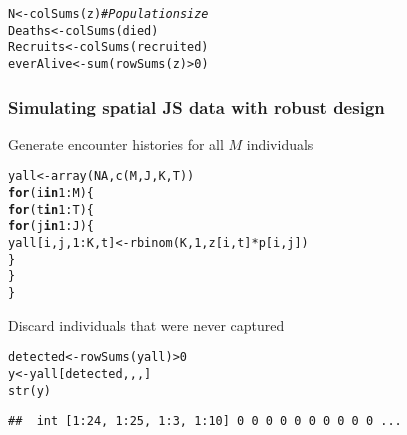 \documentclass[color=usenames,dvipsnames]{beamer}\usepackage[]{graphicx}\usepackage[]{color}
\makeatletter
\newcommand{\hlnum}[1]{\textcolor[rgb]{0.69,0.494,0}{#1}}%
\newcommand{\hlcom}[1]{\textcolor[rgb]{0.514,0.506,0.514}{\textit{#1}}}%
\newcommand{\hlopt}[1]{\textcolor[rgb]{0,0,0}{#1}}%
\newcommand{\hlstd}[1]{\textcolor[rgb]{0,0,0}{#1}}%
\newcommand{\hlkwa}[1]{\textcolor[rgb]{0,0,0}{\textbf{#1}}}%
\newcommand{\hlkwb}[1]{\textcolor[rgb]{0,0.341,0.682}{#1}}%
\newcommand{\hlkwd}[1]{\textcolor[rgb]{0.004,0.004,0.506}{#1}}%
\newenvironment{kframe}{%
 \def\at@end@of@kframe{}%
 \ifinner\ifhmode%
  \def\at@end@of@kframe{\end{minipage}}%
  \begin{minipage}{\columnwidth}%
 \fi\fi%
 \def\FrameCommand##1{\hskip\@totalleftmargin \hskip-\fboxsep
 \colorbox{shadecolor}{##1}\hskip-\fboxsep
     \hskip-\linewidth \hskip-\@totalleftmargin \hskip\columnwidth}%
 \MakeFramed {\advance\hsize-\width
   \@totalleftmargin\z@ \linewidth\hsize
   \@setminipage}}%
 {\par\unskip\endMakeFramed%
 \at@end@of@kframe}
\newenvironment{knitrout}{}{} %
\makeatother
\begin{document}
\begin{frame}[fragile]
\begin{knitrout}\scriptsize
{}\color{fgcolor}\begin{kframe}
\begin{alltt}
\hlstd{N} \hlkwb{<-} \hlkwd{colSums}\hlstd{(z)} \hlcom{# Population size}
\hlstd{Deaths} \hlkwb{<-} \hlkwd{colSums}\hlstd{(died)}
\hlstd{Recruits} \hlkwb{<-} \hlkwd{colSums}\hlstd{(recruited)}
\hlstd{everAlive} \hlkwb{<-} \hlkwd{sum}\hlstd{(}\hlkwd{rowSums}\hlstd{(z)}\hlopt{>}\hlnum{0}\hlstd{)}
\end{alltt}
\end{kframe}
\end{knitrout}
\end{frame}









\begin{frame}[fragile]
  \frametitle{Simulating spatial JS data with robust design}
{Generate encounter histories for all $M$ individuals}
\footnotesize
\begin{knitrout}
\color{fgcolor}\begin{kframe}
\begin{alltt}
\hlstd{yall} \hlkwb{<-} \hlkwd{array}\hlstd{(}\hlnum{NA}\hlstd{,} \hlkwd{c}\hlstd{(M, J, K, T))}
\hlkwa{for}\hlstd{(i} \hlkwa{in} \hlnum{1}\hlopt{:}\hlstd{M) \{}
    \hlkwa{for}\hlstd{(t} \hlkwa{in} \hlnum{1}\hlopt{:}\hlstd{T) \{}
        \hlkwa{for}\hlstd{(j} \hlkwa{in} \hlnum{1}\hlopt{:}\hlstd{J) \{}
            \hlstd{yall[i,j,}\hlnum{1}\hlopt{:}\hlstd{K,t]} \hlkwb{<-} \hlkwd{rbinom}\hlstd{(K,} \hlnum{1}\hlstd{, z[i,t]}\hlopt{*}\hlstd{p[i,j])}
        \hlstd{\}}
    \hlstd{\}}
\hlstd{\}}
\end{alltt}
\end{kframe}
\end{knitrout}
\pause
\vfill
{\normalsize Discard individuals that were never captured}
\begin{knitrout}
\color{fgcolor}\begin{kframe}
\begin{alltt}
\hlstd{detected} \hlkwb{<-} \hlkwd{rowSums}\hlstd{(yall)} \hlopt{>} \hlnum{0}
\hlstd{y} \hlkwb{<-} \hlstd{yall[detected,,,]}
\hlkwd{str}\hlstd{(y)}
\end{alltt}
\begin{verbatim}
##  int [1:24, 1:25, 1:3, 1:10] 0 0 0 0 0 0 0 0 0 0 ...
\end{verbatim}
\end{kframe}
\end{knitrout}
\end{frame}
\end{document}
